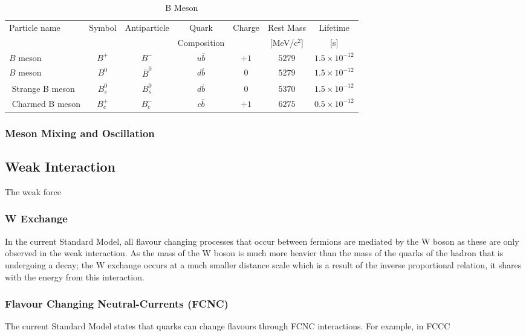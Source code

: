 \documentclass[12pt,a4paper]{article}
\begin{document}
\begin{table}[!h]
  \centering
  \caption{B Meson}
  \label{table}
  \begin{tabular}{l|c|c|c|c|c|c}
    Particle name & Symbol & Antiparticle & Quark  & Charge & Rest Mass & Lifetime \\
     &  &  & Composition &  & [MeV/c$^2$] & [s] \\
    \hline
    $B$ meson   & $B^+$  & $B^-$  & $u\overline{b}$ & $+1$ & $5279$ & $1.5 \times 10^{-12}$ \\
    $B$ meson   & $B^0$  & $\overline{B}^0$  & $d\overline{b}$ & $0$ & $5279$ & $1.5 \times 10^{-12}$ \\
    $ $ Strange B meson  & $B_s^0$ & $B_s^0$ & $d\overline{b}$ & $0$ & $5370$ & $1.5 \times 10^{-12}$ \\
    $ $ Charmed B meson  & $B_c^+$ & $B_c^-$ & $c\overline{b}$ & $+1$ & $6275$ & $0.5 \times 10^{-12}$ \\
    \hline
  \end{tabular}
\end{table}

\subsubsection{Meson Mixing and Oscillation}

\subsection{Weak Interaction}
The weak force 

\subsubsection{W Exchange}
In the current Standard Model, all flavour changing processes that occur between fermions are mediated by the W boson as these are only observed in the weak interaction. As the mass of the W boson is much more heavier than the mass of the quarks of the hadron that is undergoing a decay; the W exchange occurs at a much smaller distance scale which is a result of the inverse proportional relation, it shares with the energy from this interaction.

\subsubsection{Flavour Changing Neutral-Currents (FCNC)}
The current Standard Model states that quarks can change flavours through FCNC interactions. For example, in 
FCCC 
\end{document}
